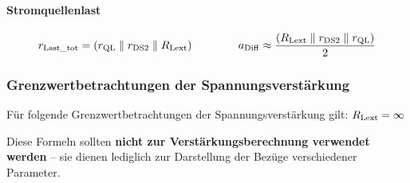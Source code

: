 

\paragraph{Stromquellenlast}    %

\vspace{-0.2cm}



\[
    r_{\rm Last\_tot} =  \left( r_{\rm QL} \parallel r_{\rm DS2} \parallel R_{\rm Lext} \right) \qquad \qquad
    a_{\rm Diff} \approx \frac{ \left( R_{\rm Lext} \parallel r_{\rm DS2} \parallel r_{\rm QL} \right) }{2}
\]



\subsubsection{Grenzwertbetrachtungen der Spannungsverstärkung}

Für folgende Grenzwertbetrachtungen der Spannungsverstärkung gilt: $R_{\rm Lext} = \infty$


\medskip

Diese Formeln sollten \textbf{nicht zur Verstärkungsberechnung verwendet werden} -- sie dienen lediglich zur Darstellung der Bezüge verschiedener Parameter.


